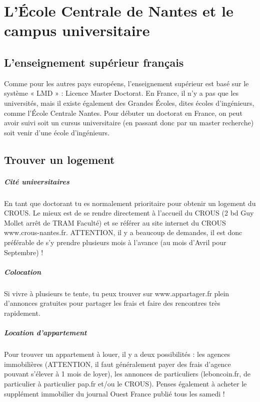 \chapter{L'École Centrale de Nantes et le campus universitaire}

\section{L'enseignement supérieur français}\trad
Comme pour les autres pays européens, l'enseignement supérieur est basé sur le système « LMD » : Licence Master Doctorat.
En France, il n'y a pas que les universités, mais il existe également des Grandes Écoles, dites écoles d'ingénieurs, comme l'École Centrale Nantes.
Pour débuter un doctorat en France, on peut avoir suivi soit un cursus universitaire (en passant donc par un master recherche) soit venir d'une école d'ingénieurs.




\section{Trouver un logement}\trad
\paragraph{Cité universitaires} En tant que doctorant tu es normalement prioritaire pour obtenir un logement du CROUS. Le mieux est de se rendre directement  à l'accueil du CROUS (2 bd Guy Mollet arrêt de TRAM Faculté) et se référer au site internet du CROUS www.crous-nantes.fr. ATTENTION, il y a beaucoup de demandes, il est donc préférable de s'y prendre plusieurs mois à l'avance (au mois d'Avril pour Septembre) !
\paragraph{Colocation} Si vivre à plusieurs te tente, tu peux trouver sur www.appartager.fr plein d'annonces gratuites pour partager les frais et faire des rencontres très rapidement.
\paragraph{Location d'appartement} Pour trouver un appartement à louer, il y a deux possibilités : les agences immobilières (ATTENTION, il faut généralement payer des frais d'agence pouvant s'élever à 1 mois de loyer), les annonces de particuliers (leboncoin.fr, de particulier à particulier pap.fr et/ou le CROUS). Penses également à acheter le supplément immobilier du journal Ouest France publié tous les samedi !
